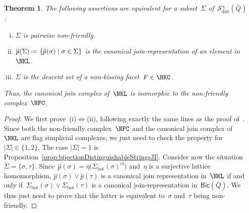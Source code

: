 \documentclass{amsart}
\newtheorem{theorem}{Theorem}[part]
\theoremstyle{definition}
\newcommand{\set}[2]{\left\{ #1 \;\middle|\; #2 \right\}} %
\newcommand{\eqdef}{\mbox{\,\raisebox{0.2ex}{\scriptsize\ensuremath{\mathrm:}}\ensuremath{=}\,}} %
\newcommand{\distinguishableStrings}{\mathcal{S}_\mathrm{dist}} %
\newcommand{\bottom}{\mathrm{bot}} %
\newcommand{\join}{\vee} %
\newcommand{\closure}[1]{#1^{\mathrm{cl}}} %
\newcommand{\Bicl}[1]{\mathsf{Bic}(#1)} %
\newcommand{\ji}{\mathsf{ji}} %
\begin{document}
\begin{theorem}
The following assertions are equivalent for a subset~$\Sigma$ of~$\distinguishableStrings^\pm(\bar Q)$:
\begin{enumerate}[(i)]
\item $\Sigma$ is pairwise non-friendly.
\item $\ji(\Sigma) \eqdef \set{\ji(\sigma)}{\sigma \in \Sigma}$ is the canonical join-representation of an element in~$\NKL$.
\item $\Sigma$ is the descent set of a non-kissing facet~$F \in \NKC$.
\end{enumerate}
Thus, the canonical join complex of~$\NKL$ is isomorphic to the non-friendly complex~$\NFC$.
\end{theorem}

\begin{proof}
We first prove~(i)$\iff$(ii), following exactly the same lines as the proof of~\cite[Thm.~4.9]{GarverMcConville-grid}.
Since both the non-friendly complex~$\NFC$ and the canonical join complex of~$\NKL$ are flag simplicial complexes, we just need to check the property for~$|\Sigma| \in \{1,2\}$.
The case $|\Sigma| = 1$ is Proposition~\ref{prop:bijectionDistinguishableStringsJI}.
Consider now the situation~$\Sigma = \{\sigma, \tau\}$.
Since~$\ji(\sigma) = \eta \big( \closure{\Sigma_\bottom(\sigma)} \big)$ and~$\eta$ is a surjective lattice homomorphism, $\ji(\sigma) \join \ji(\tau)$ is a canonical join representation in~$\NKL$ if and only if~$\Sigma_\bottom(\sigma) \join \Sigma_\bottom(\tau)$ is a canonical join-representation in~$\Bicl{\bar Q}$.
We thus just need to prove that the latter is equivalent to~$\sigma$ and~$\tau$ being non-friendly.


\end{proof}
\end{document}
